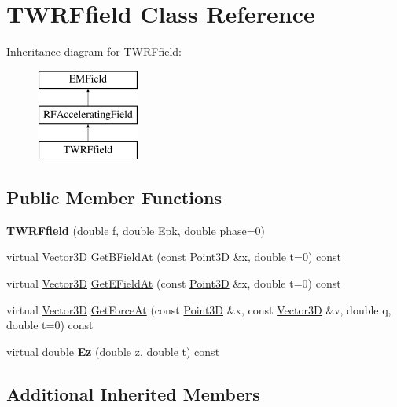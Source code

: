 \hypertarget{classTWRFfield}{}\section{T\+W\+R\+Ffield Class Reference}
\label{classTWRFfield}
Inheritance diagram for T\+W\+R\+Ffield\+:\begin{figure}[H]
\begin{center}
\leavevmode
\includegraphics[height=3.000000cm]{classTWRFfield}
\end{center}
\end{figure}
\subsection*{Public Member Functions}
\begin{DoxyCompactItemize}
\item 
\mbox{\label{classTWRFfield_a4cf138864c1d5f2bd956da9fc5df13cd}} 
{\bfseries T\+W\+R\+Ffield} (double f, double Epk, double phase=0)
\item 
virtual \hyperlink{classTVec3D}{Vector3D} \hyperlink{classTWRFfield_af7323274ea32ee6c91d447e5dcdd1f89}{Get\+B\+Field\+At} (const \hyperlink{classTVec3D}{Point3D} \&x, double t=0) const
\item 
virtual \hyperlink{classTVec3D}{Vector3D} \hyperlink{classTWRFfield_a36c281b70fb42827fe16450863b81cc2}{Get\+E\+Field\+At} (const \hyperlink{classTVec3D}{Point3D} \&x, double t=0) const
\item 
virtual \hyperlink{classTVec3D}{Vector3D} \hyperlink{classTWRFfield_a9674bc165692a22af4edd4ce928c202c}{Get\+Force\+At} (const \hyperlink{classTVec3D}{Point3D} \&x, const \hyperlink{classTVec3D}{Vector3D} \&v, double q, double t=0) const
\item 
\mbox{\label{classTWRFfield_a2c3e81c0a6572740cca163066df4a391}} 
virtual double {\bfseries Ez} (double z, double t) const
\end{DoxyCompactItemize}
\subsection*{Additional Inherited Members}


